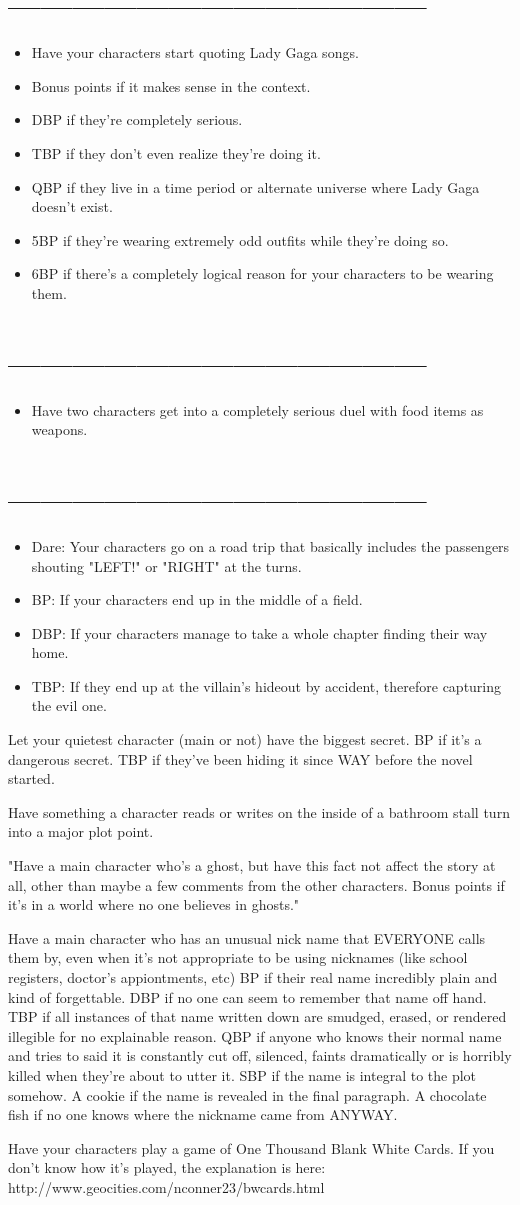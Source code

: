 \documentclass[a4paper,12pt]{article}
\newcommand{\bi}{\section{---------------------------------------}\begin{itemize}}
\newcommand{\ei}{\end{itemize}}
\newcommand{\todo}{\item[$\square$]}
\begin{document}
\bi
\todo Have your characters start quoting Lady Gaga songs.
\todo Bonus points if it makes sense in the context.
\todo DBP if they’re completely serious.
\todo TBP if they don’t even realize they’re doing it.
\todo QBP if they live in a time period or alternate universe where Lady Gaga doesn’t exist.
\todo 5BP if they’re wearing extremely odd outfits while they’re doing so.
\todo 6BP if there’s a completely logical reason for your characters to be wearing them.
\ei

\bi
\todo Have two characters get into a completely serious duel with food items as weapons.
\ei

\bi
\todo Dare: Your characters go on a road trip that basically includes the passengers shouting "LEFT!" or "RIGHT" at the turns.
\todo BP: If your characters end up in the middle of a field.
\todo DBP: If your characters manage to take a whole chapter finding their way home.
\todo TBP: If they end up at the villain's hideout by accident, therefore capturing the evil one.
\ei

Let your quietest character (main or not) have the biggest secret. BP if it's a dangerous secret. TBP if they've been hiding it since WAY before the novel started.

Have something a character reads or writes on the inside of a bathroom stall turn into a major plot point.

"Have a main character who’s a ghost, but have this fact not affect the story at all, other than maybe a few comments from the other characters.
Bonus points if it’s in a world where no one believes in ghosts."

Have a main character who has an unusual nick name that EVERYONE calls them by, even when it's not appropriate to be using nicknames (like school registers, doctor's appiontments, etc)
BP if their real name incredibly plain and kind of forgettable.
DBP if no one can seem to remember that name off hand.
TBP if all instances of that name written down are smudged, erased, or rendered illegible for no explainable reason.
QBP if anyone who knows their normal name and tries to said it is constantly cut off, silenced, faints dramatically or is horribly killed when they're about to utter it.
SBP if the name is integral to the plot somehow.
A cookie if the name is revealed in the final paragraph.
A chocolate fish if no one knows where the nickname came from ANYWAY.

Have your characters play a game of One Thousand Blank White Cards. If you don't know how it's played, the explanation is here:
http://www.geocities.com/nconner23/bwcards.html
\end{document}
